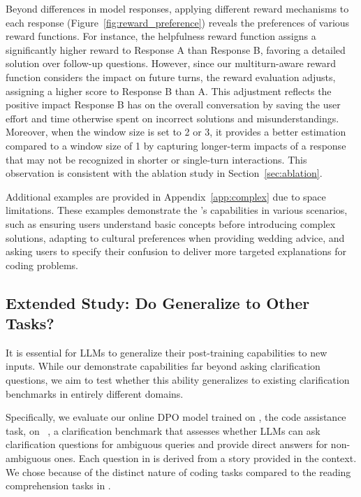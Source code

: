 Beyond differences in model responses, applying different reward mechanisms to each response (Figure~\ref{fig:reward_preference}) reveals the preferences of various reward functions. For instance, the helpfulness reward function assigns a significantly higher reward to Response A than Response B, favoring a detailed solution over follow-up questions. However, since our multiturn-aware reward function considers the impact on future turns, the reward evaluation adjusts, assigning a higher score to Response B than A. This adjustment reflects the positive impact Response B has on the overall conversation by saving the user effort and time otherwise spent on incorrect solutions and misunderstandings. Moreover, when the window size is set to 2 or 3, it provides a better estimation compared to a window size of 1 by capturing longer-term impacts of a response that may not be recognized in shorter or single-turn interactions. This observation is consistent with the ablation study in Section~\ref{sec:ablation}.

Additional examples are provided in Appendix~\ref{app:complex} due to space limitations. These examples demonstrate the \object's capabilities in various scenarios, such as ensuring users understand basic concepts before introducing complex solutions, adapting to cultural preferences when providing wedding advice, and asking users to specify their confusion to deliver more targeted explanations for coding problems.


\subsection{Extended Study: Do \Objects Generalize to Other Tasks?}
\label{sec:extended}
It is essential for LLMs to generalize their post-training capabilities to new inputs. While our \objects demonstrate capabilities far beyond asking clarification questions, we aim to test whether this ability generalizes to existing clarification benchmarks in entirely different domains.

Specifically, we evaluate our online DPO model trained on \codet, the code assistance task, on \ambcoqa~\cite{abg_coqa}, a clarification benchmark that assesses whether LLMs can ask clarification questions for ambiguous queries and provide direct answers for non-ambiguous ones. Each question in \ambcoqa is derived from a story provided in the context. We chose \codet because of the distinct nature of coding tasks compared to the reading comprehension tasks in \ambcoqat.

